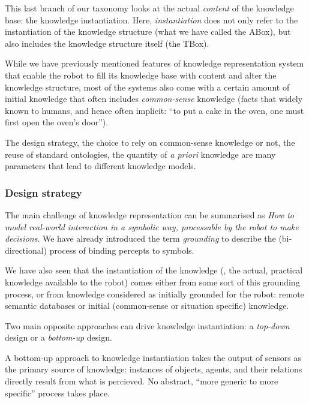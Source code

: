 This last branch of our taxonomy looks at the actual \emph{content} of the
knowledge base: the knowledge instantiation. Here, \emph{instantiation} does
not only refer to the instantiation of the knowledge structure (what we have
called the ABox), but also includes the knowledge structure itself (the TBox).

While we have previously mentioned features of knowledge representation system
that enable the robot to fill its knowledge base with content and alter the
knowledge structure, most of the systems also come with a certain amount of
initial knowledge that often includes \emph{common-sense} knowledge (\ie facts
that widely known to humans, and hence often implicit: ``to put a cake in the
oven, one must first open the oven's door'').

The design strategy, the choice to rely on common-sense knowledge or not, the
reuse of standard ontologies, the quantity of {\it a priori} knowledge are many
parameters that lead to different knowledge models.


\subsubsection{Design strategy}
\label{sect|design-strategies}

The main challenge of knowledge representation can be summarised as \emph{How to
model real-world interaction in a symbolic way, processable by the robot to
make decisions}. We have already introduced the term \emph{grounding} to
describe the (bi-directional) process of binding percepts to symbols.

We have also seen that the instantiation of the knowledge (\ie, the actual,
practical knowledge available to the robot) comes either from some sort of this
grounding process, or from knowledge considered as initially grounded for the
robot: remote semantic databases or initial (common-sense or situation
specific) knowledge.

Two main opposite approaches can drive knowledge instantiation: a
\emph{top-down} design or a \emph{bottom-up} design.

A bottom-up approach to knowledge instantiation takes the output of sensors as
the primary source of knowledge: instances of objects, agents, and their
relations directly result from what is percieved. No abstract, ``more generic
to more specific'' process takes place.

